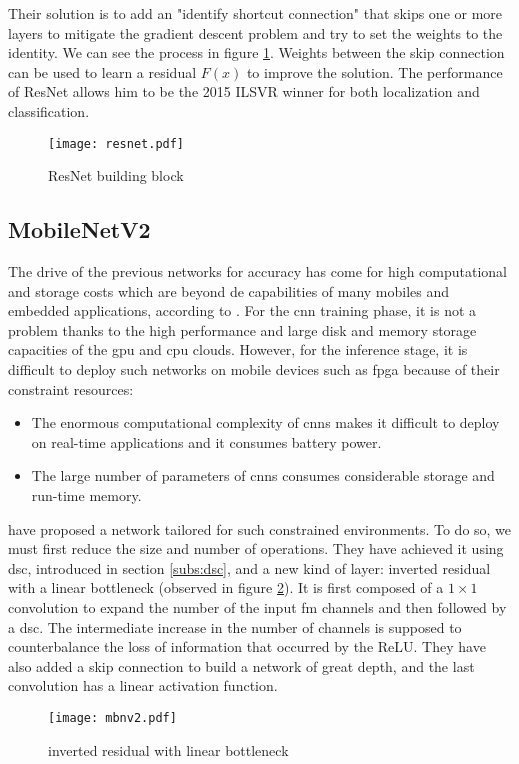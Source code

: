 Their solution is to add an "identify shortcut connection" that skips one or more layers to mitigate the gradient descent problem and try to set the weights to the identity. We can see the process in figure \ref{fig:resnet}. Weights between the skip connection can be used to learn a residual $F(x)$ to improve the solution. The performance of ResNet allows him to be the 2015 ILSVR winner for both localization and classiﬁcation.
%
\begin{figure}
    \centering
    \texttt{[image: resnet.pdf]}
    \caption{ResNet building block \cite{he_deep_2015}}
    \label{fig:resnet}
\end{figure}
%
\subsection{MobileNetV2} \label{subs:mbv2}
The drive of the previous networks for accuracy has come for high computational and storage costs which are beyond de capabilities of many mobiles and embedded applications, according to \textcite{cheng_recent_2018}. For the \acrshort{cnn} training phase, it is not a problem thanks to the high performance and large disk and memory storage capacities of the \acrshort{gpu} and \acrshort{cpu} clouds. However, for the inference stage, it is difficult to deploy such networks on mobile devices such as \acrshort{fpga} because of their constraint resources:
%
\begin{itemize}
    \item The enormous computational complexity of \acrshort{cnn}s makes it difficult to deploy on real-time applications and it consumes battery power.
    \item The large number of parameters of \acrshort{cnn}s consumes considerable storage and run-time memory.
\end{itemize}

\textcite{sandler_mobilenetv2_2019} have proposed a network tailored for such constrained environments. To do so, we must first reduce the size and number of operations. They have achieved it using \acrshort{dsc}, introduced in section \ref{subs:dsc}, and a new kind of layer: inverted residual with a linear bottleneck (observed in figure \ref{fig:invreslinbot}). It is first composed of a $1 \times 1$ convolution to expand the number of the input \acrshort{fm} channels and then followed by a \acrshort{dsc}. The intermediate increase in the number of channels is supposed to counterbalance the loss of information that occurred by the ReLU. They have also added a skip connection to build a network of great depth, and the last convolution has a linear activation function.
%
\begin{figure}
    \centering
    \texttt{[image: mbnv2.pdf]}
    \caption{inverted residual with linear bottleneck \cite{sandler_mobilenetv2_2019}}
    \label{fig:invreslinbot}
\end{figure}
